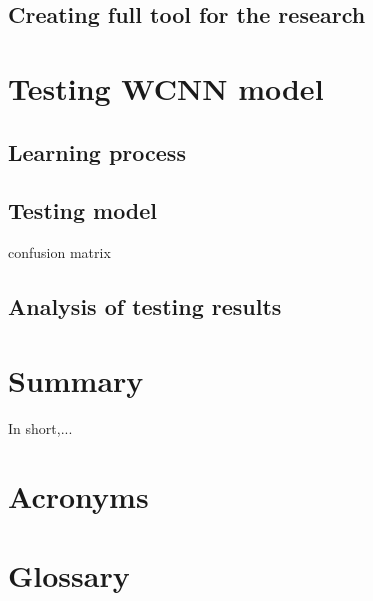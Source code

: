 \documentclass[12pt, a4paper, twoside]{scrartcl}
\begin{document}
\subsection{Creating full tool for the research}

\clearpage


\section{Testing \ac{WCNN} model}

\subsection{Learning process}

\subsection{Testing model}

confusion matrix

\subsection{Analysis of testing results}

\clearpage


\section*{Summary}

In short,...

\clearpage




\clearpage

\section*{Acronyms}

\clearpage

\section*{Glossary}
\clearpage

\listoffigures
{}
\clearpage

\listoftables
{}
\clearpage

\lstlistoflistings
{}
\end{document}
